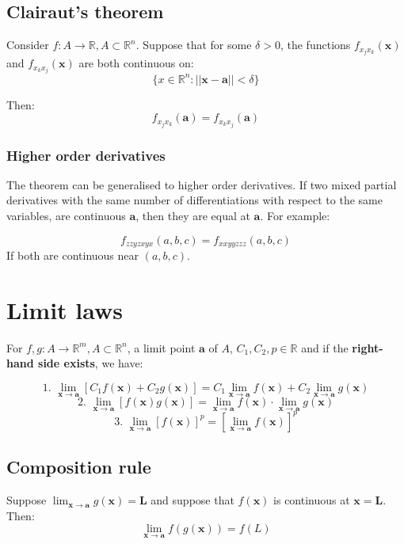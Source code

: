 \documentclass[11pt]{article}
\begin{document}
\subsection{Clairaut's theorem}
\label{sec:orge39f6d5}
Consider \(f : A \rightarrow \mathbb{R}, A \subset \mathbb{R}^n\). Suppose that for some \(\delta > 0\), the functions \(f_{x_j x_k} (\boldsymbol{x})\) and \(f_{x_k x_j} (\boldsymbol{x})\) are both continuous on:
\[\{x \in \mathbb{R}^n : ||\boldsymbol{x} - \boldsymbol{a}|| < \delta\}\]

Then:
\[f_{x_j x_k} (\boldsymbol{a}) = f_{x_k x_j}(\boldsymbol{a})\]
\subsubsection{Higher order derivatives}
\label{sec:orgb9af51c}
The theorem can be generalised to higher order derivatives. If two mixed partial derivatives with the same number of differentiations with respect to the same variables, are continuous \(\boldsymbol{a}\), then they are equal at \(\boldsymbol{a}\). For example:

\[f_{zzyzxyx} (a, b, c) = f_{xxyyzzz} (a, b, c)\]
If both are continuous near \((a, b, c)\).
\section{Limit laws}
\label{sec:orga4bd712}
For \(f, g : A \rightarrow \mathbb{R}^m, A \subset \mathbb{R}^n\), a limit point \(\boldsymbol{a}\) of \(A\), \(C_1, C_2, p \in \mathbb{R}\) and if the \textbf{right-hand side exists}, we have:

\[\text{1. } \lim_{\boldsymbol{x} \rightarrow \boldsymbol{a}} [C_1 f(\boldsymbol{x}) + C_2 g(\boldsymbol{x})] = C_1 \lim_{\boldsymbol{x} \rightarrow \boldsymbol{a}} f(\boldsymbol{x}) + C_2 \lim_{\boldsymbol{x} \rightarrow \boldsymbol{a}} g(\boldsymbol{x})\]
\[\text{2. } \lim_{\boldsymbol{x} \rightarrow \boldsymbol{a}} [f(\boldsymbol{x}) g(\boldsymbol{x})] = \lim_{\boldsymbol{x} \rightarrow \boldsymbol{a}} f(\boldsymbol{x}) \cdot \lim_{\boldsymbol{x} \rightarrow \boldsymbol{a}} g(\boldsymbol{x})\]
\[\text{3. } \lim_{\boldsymbol{x} \rightarrow \boldsymbol{a}} [f(\boldsymbol{x})]^p = \left[\lim_{\boldsymbol{x} \rightarrow \boldsymbol{a}} f(\boldsymbol{x}) \right]^p\]
\subsection{Composition rule}
\label{sec:org8a303a0}
Suppose \(\lim_{\boldsymbol{x} \rightarrow \boldsymbol{a}} g(\boldsymbol{x}) = \boldsymbol{L}\) and suppose that \(f(\boldsymbol{x})\) is continuous at \(\boldsymbol{x} = \boldsymbol{L}\). Then:
\[\lim_{\boldsymbol{x} \rightarrow \boldsymbol{a}} f(g(\boldsymbol{x})) = f(L)\]
\end{document}
